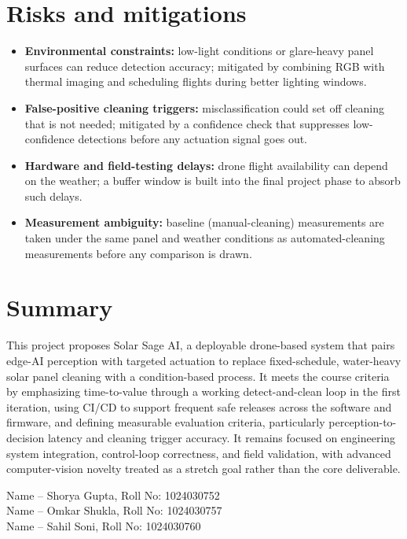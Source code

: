 \documentclass[11pt]{article}
\begin{document}
\section{Risks and mitigations}
\begin{itemize}
    \item \textbf{Environmental constraints:} low-light conditions or glare-heavy panel surfaces can reduce detection accuracy; mitigated by combining RGB with thermal imaging and scheduling flights during better lighting windows.
    \item \textbf{False-positive cleaning triggers:} misclassification could set off cleaning that is not needed; mitigated by a confidence check that suppresses low-confidence detections before any actuation signal goes out.
    \item \textbf{Hardware and field-testing delays:} drone flight availability can depend on the weather; a buffer window is built into the final project phase to absorb such delays.
    \item \textbf{Measurement ambiguity:} baseline (manual-cleaning) measurements are taken under the same panel and weather conditions as automated-cleaning measurements before any comparison is drawn.
\end{itemize}

\section{Summary}
This project proposes Solar Sage AI, a deployable drone-based system that pairs edge-AI perception with targeted actuation to replace fixed-schedule, water-heavy solar panel cleaning with a condition-based process. It meets the course criteria by emphasizing time-to-value through a working detect-and-clean loop in the first iteration, using CI/CD to support frequent safe releases across the software and firmware, and defining measurable evaluation criteria, particularly perception-to-decision latency and cleaning trigger accuracy. It remains focused on engineering system integration, control-loop correctness, and field validation, with advanced computer-vision novelty treated as a stretch goal rather than the core deliverable.

\vspace{1cm}
\noindent
Name -- Shorya Gupta, Roll No: 1024030752 \\
Name -- Omkar Shukla, Roll No: 1024030757 \\
Name -- Sahil Soni, Roll No: 1024030760
\end{document}
